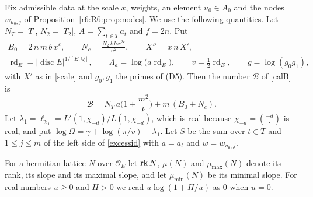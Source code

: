 Fix admissible data at the scale $x$, weights, an element $u_0\in A_0$ and the nodes $w_{u_0,j}$ of Proposition~\ref{r6:R6:prop:nodes}. We use the following quantities. Let $N_T=\lvert T\rvert$, $N_2=\lvert T_2\rvert$, $A=\sum_{t\in T}a_t$ and $f=2n$. Put
\begin{gather*}
B_0=2\,n\,m\,b\,x^{\varepsilon},\qquad N_c=\frac{N_2\,k\,b\,x^{2\varepsilon}}{n^2},\qquad X''=x\,n\,X',\\
\operatorname{rd}_E=\lvert\operatorname{disc}E\rvert^{1/[E:\mathbb Q]},\qquad\Lambda_a=\log\big(a\operatorname{rd}_E\big),\qquad v=\tfrac12\operatorname{rd}_E,\qquad g=\log(g_0g_1),
\end{gather*}
with $X'$ as in \eqref{scale} and $g_0,g_1$ the primes of (D5). Then the number $\mathcal B$ of \eqref{calB} is
\begin{equation}\label{r6:R6:calB}
\mathcal B=N_T\,a\Big(1+\frac{m^2}k\Big)+m\,(B_0+N_c).
\end{equation}
Let $\lambda_1=\ell_{\chi_1}=L'(1,\chi_{-d})/L(1,\chi_{-d})$, which is real because $\chi_{-d}=(\frac{-d}{\cdot})$ is real, and put $\log\Omega=\gamma+\log(\pi/v)-\lambda_1$. Let $S$ be the sum over $t\in T$ and $1\le j\le m$ of the left side of \eqref{excessid} with $a=a_t$ and $w=w_{u_0,j}$.

For a hermitian lattice $N$ over $\mathcal O_E$ let $\operatorname{rk} N$, $\mu(N)$ and $\mu_{\max}(N)$ denote its rank, its slope and its maximal slope, and let $\mu_{\min}(N)$ be its minimal slope. For real numbers $u\ge0$ and $H>0$ we read $u\log(1+H/u)$ as $0$ when $u=0$.

